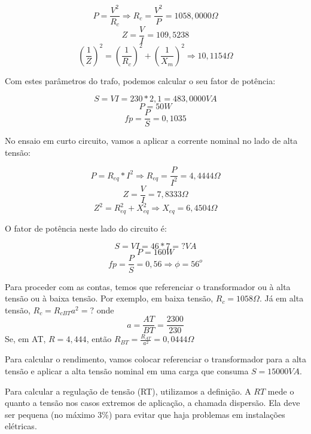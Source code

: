 \documentclass[12pt, a4paper, twoside]{article}
\begin{document}
$$ P = \frac{V^2}{R_c} \Rightarrow R_c = \frac{V^2}{P} = 1058,0000 \Omega $$
$$ Z = \frac{V}{I} = 109,5238 $$
$$ (\frac{1}{Z})^2 = (\frac{1}{R_c})^2 + (\frac{1}{X_m})^2 \Rightarrow 10,1154 \Omega $$

Com estes parâmetros do trafo, podemos calcular o seu fator de potência:

$$ S = VI = 230 * 2,1 = 483,0000 VA $$
$$ P = 50W $$
$$ fp = \frac{P}{S} = 0,1035 $$

No ensaio em curto circuito, vamos a aplicar a corrente nominal no lado de alta tensão:

$$ P = R_{eq} * I^2 \Rightarrow R_{eq} = \frac{P}{I^2} = 4,4444 \Omega $$
$$ Z = \frac{V}{I} = 7,8333 \Omega $$
$$ Z^2 = R_{eq}^2 + X_{eq}^2 \Rightarrow X_{eq} = 6,4504 \Omega $$

O fator de potência neste lado do circuito é:

$$ S = VI = 46 * 7 = ? VA $$
$$ P = 160W$$
$$ fp = \frac{P}{S} = 0,56 \Rightarrow \phi = 56^o $$

Para proceder com as contas, temos que referenciar o transformador ou à alta tensão ou à baixa tensão. Por exemplo, em baixa tensão, $R_c = 1058 \Omega$. Já em alta tensão, $R_c = R_{c BT} a^2 = ? $ onde
$$ a = \frac{AT}{BT} = \frac{2300}{230} $$
Se, em AT, $ R = 4,444 $, então $R_{BT} = \frac{R_{AT}}{a^2} = 0,0444 \Omega $

Para calcular o rendimento, vamos colocar referenciar o transformador para a alta tensão e aplicar a alta tensão nominal em uma carga que consuma $ S = 15000VA $.

Para calcular a regulação de tensão (RT), utilizamos a definição. A $RT$ mede o quanto a tensão nos casos extremos de aplicação, a chamada dispersão. Ela deve ser pequena (no máximo 3\%) para evitar que haja problemas em instalações elétricas.
\end{document}
